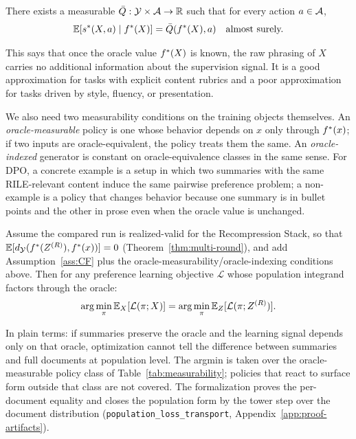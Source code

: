 \begin{assumption}\label{ass:CF}
There exists a measurable $\bar{Q}: \mathcal{Y} \times \mathcal{A} \to \mathbb{R}$ such that for every action $a \in \mathcal{A}$,
\[
\mathbb{E}\!\left[s^\ast(X, a) \mid f^\ast(X)\right] = \bar{Q}(f^\ast(X), a) \quad \text{almost surely.}
\]
\end{assumption}

This says that once the oracle value $f^\ast(X)$ is known, the raw phrasing of $X$ carries no additional information about the supervision signal. It is a good approximation for tasks with explicit content rubrics and a poor approximation for tasks driven by style, fluency, or presentation.

We also need two measurability conditions on the training objects themselves. An \emph{oracle-measurable} policy is one whose behavior depends on $x$ only through $f^\ast(x)$; if two inputs are oracle-equivalent, the policy treats them the same. An \emph{oracle-indexed} generator is constant on oracle-equivalence classes in the same sense. For DPO, a concrete example is a setup in which two summaries with the same RILE-relevant content induce the same pairwise preference problem; a non-example is a policy that changes behavior because one summary is in bullet points and the other in prose even when the oracle value is unchanged.

\begin{theorem}\label{thm:pref-equiv}
Assume the compared run is realized-valid for the Recompression Stack, so that $\mathbb{E}[d_{\mathcal{Y}}(f^\ast(Z^{(R)}), f^\ast(x))] = 0$ (Theorem~\ref{thm:multi-round}), and add Assumption~\ref{ass:CF} plus the oracle-measurability/oracle-indexing conditions above. Then for any preference learning objective $\mathcal{L}$ whose population integrand factors through the oracle:
\[
\arg\min_\pi \mathbb{E}_X[\mathcal{L}(\pi; X)] = \arg\min_\pi \mathbb{E}_Z[\mathcal{L}(\pi; Z^{(R)})].
\]
\end{theorem}

\noindent In plain terms: if summaries preserve the oracle and the learning signal depends only on that oracle, optimization cannot tell the difference between summaries and full documents at population level. The argmin is taken over the oracle-measurable policy class of Table~\ref{tab:measurability}; policies that react to surface form outside that class are not covered. The formalization proves the per-document equality and closes the population form by the tower step over the document distribution (\texttt{population\_loss\_transport}, Appendix~\ref{app:proof-artifacts}).


